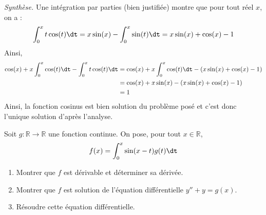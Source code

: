 \documentclass[a4paper,10pt]{report}
\begin{document}
\medskip

\noindent \textit{Synthèse.} Une intégration par parties (bien justifiée) montre que pour tout réel $x$, on a :
$$ \int_0^x t \cos(t) \dt = x \sin(x) - \int_0^x \sin(t) \dt = x \sin(x) + \cos(x) - 1 $$
Ainsi,
\begin{align*}
\cos(x) + x \int_0^x \cos(t) \dt - \int_0^x t \cos(t) \dt & =  \cos(x) + x \int_0^x \cos(t) \dt  - (x \sin(x) + \cos(x) - 1) \\
& = \cos(x) + x \sin(x)  - (x \sin(x) + \cos(x) - 1) \\
& = 1 
\end{align*}
Ainsi, la fonction cosinus est bien solution du problème posé et c'est donc l'unique solution d'après l'analyse.

\begin{Exa} Soit $g : \mathbb{R} \rightarrow \mathbb{R}$ une fonction continue. On pose, pour tout $x \in \mathbb{R}$,
    \[
    f(x) = \int_0^x {\sin(x - t)g(t) \dt}
    \]
    \begin{enumerate}
      \item Montrer que $f$ est dérivable et déterminer sa dérivée.
      \item Montrer que $f$ est solution de l'équation différentielle $y'' + y = g(x)$.
      \item Résoudre cette équation différentielle.
    \end{enumerate}
\end{Exa}
\end{document}
